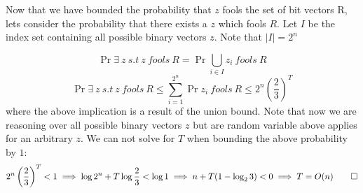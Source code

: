 \documentclass[12pt]{article}
\begin{document}
\begin{solution}
Now that we have bounded the probability that $z$ fools the set of bit vectors R, lets consider the probability that there exists a $z$ which fools $R$. Let $I$ be the index set containing all possible binary vectors $z$. Note that $|I| = 2^n$

\[
\Pr{\exists~z~s.t~z~fools~R} = \Pr{\bigcup_{i\in I} z_i~fools~R}
\]
\[
\Pr{\exists~z~s.t~z~fools~R} \leq \sum_{i=1}^{2^n}{\Pr{z_i~fools~R}} \leq 2^n\left(\frac{2}{3}\right)^T 
\]
where the above implication is a result of the union bound. Note that now we are reasoning over all possible binary vectors $z$ but are random variable above applies for an arbitrary $z$. We can not solve for $T$ when bounding the above probability by $1$:
\[
2^n\left(\frac{2}{3}\right)^T < 1 \implies \log{2^n} + T\log{\frac{2}{3}} < \log{1} \implies n + T(1 - \log_{2}{3}) < 0 \implies T = O(n) \qed
\]
\end{solution}
\clearpage
\end{document}
